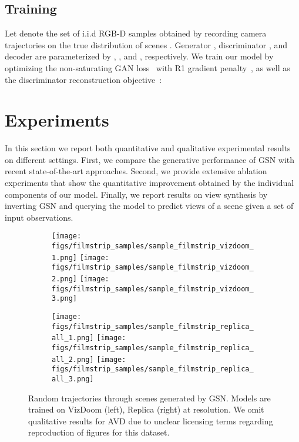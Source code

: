 \documentclass[10pt,twocolumn,letterpaper]{article}
\begin{document}
\subsection{Training}

Let  denote the set of  i.i.d RGB-D samples obtained by recording camera trajectories on the true distribution of scenes . Generator , discriminator , and decoder  are parameterized by , , and , respectively.  We train our model by optimizing the non-saturating GAN loss~\cite{gan} with R1 gradient penalty~\cite{r1}, as well as the discriminator reconstruction objective~\cite{self_supervised_discriminator}: 
\newcommand{\generator}{G_{\theta}}
\newcommand{\discriminator}{D_{\phi}}
\newcommand{\decoder}{C_{\omega}}


\section{Experiments} \label{sect:experiments}
In this section we report both quantitative and qualitative experimental results on different settings. First, we compare the generative performance of GSN with recent state-of-the-art approaches. Second, we provide extensive ablation experiments that show the quantitative improvement obtained by the individual components of our model. Finally, we report results on view synthesis by inverting GSN and querying the model to predict views of a scene given a set of input observations. 

\begin{figure*}[t]
    \centering
        \begin{subfigure}{0.35\linewidth}
            \centering
            \texttt{[image: figs/filmstrip\_samples/sample\_filmstrip\_vizdoom\_1.png]}
            \texttt{[image: figs/filmstrip\_samples/sample\_filmstrip\_vizdoom\_2.png]}
            \texttt{[image: figs/filmstrip\_samples/sample\_filmstrip\_vizdoom\_3.png]}
        \end{subfigure} 
        \hspace{1cm}
        \begin{subfigure}{0.35\linewidth}
            \centering
            \texttt{[image: figs/filmstrip\_samples/sample\_filmstrip\_replica\_all\_1.png]}
            \texttt{[image: figs/filmstrip\_samples/sample\_filmstrip\_replica\_all\_2.png]}
            \texttt{[image: figs/filmstrip\_samples/sample\_filmstrip\_replica\_all\_3.png]}
        \end{subfigure} \hfill
    \caption{Random trajectories through scenes generated by GSN. Models are trained on VizDoom \cite{vizdoom} (left), Replica \cite{replica} (right) at  resolution. We omit qualitative results for AVD \cite{avd} due to unclear licensing terms regarding reproduction of figures for this dataset.}
    \label{fig:scene_samples}
\end{figure*}
\end{document}
